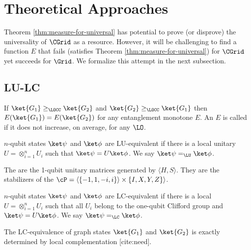 \section{Theoretical Approaches}

Theorem \ref{thm:measure-for-universal} has potential to prove (or disprove) the universality of $\CGrid$ as a resource. However, it will be challenging to find a function $E$ that fails (satisfies Theorem \ref{thm:measure-for-universal}) for $\CGrid$ yet succeeds for $\Grid$. We formalize this attempt in the next subsection.

\subsection{LU-LC}

\begin{definition}
If $\ket{G_1} \geq_\LOCC \ket{G_2}$ and $\ket{G_2} \geq_\LOCC \ket{G_1}$ then $E(\ket{G_1}) = E(\ket{G_2})$ for any entanglement monotone $E$. An $E$ is called  if it does not increase, on average, for any $\LO$.
\end{definition}

\begin{definition}
$n$-qubit states $\ket\psi$ and $\ket\phi$ are LU-equivalent if there is a local unitary $U = \otimes_{i=1}^n U_i$ such that $\ket\psi = U \ket\phi$. We say $\ket\psi =_\LU \ket\phi$.
\end{definition}

\begin{definition}
The  are the 1-qubit unitary matrices generated by $\langle H, S \rangle$. They are the stabilizers of the  $\cP = \langle \{-1,1,-i,i\} \rangle \times \{I,X,Y,Z\} \rangle$.
\end{definition}

\begin{definition}
$n$-qubit states $\ket\psi$ and $\ket\phi$ are LC-equivalent if there is a local  $U = \otimes_{i=1}^n U_i$ such that all $U_i$ belong to the one-qubit Clifford group and $\ket\psi = U \ket\phi$. We say $\ket\psi =_\LC \ket\phi$.
\end{definition}

\begin{theorem}
The LC-equivalence of graph states $\ket{G_1}$ and $\ket{G_2}$ is exactly determined by local complementation [cite:need]. 
\end{theorem}

